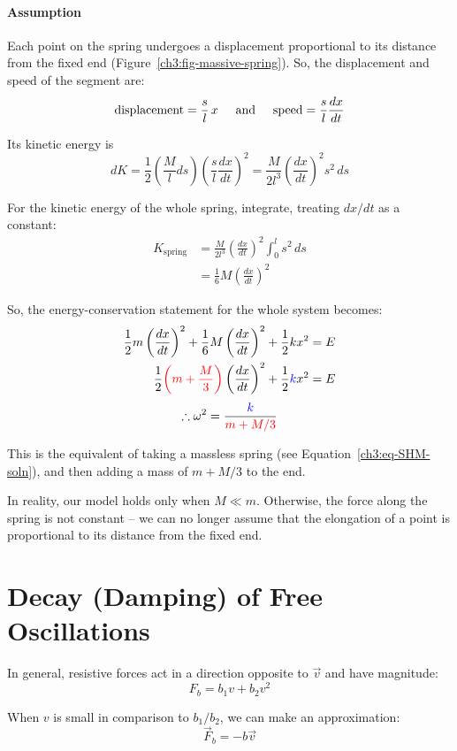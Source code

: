 \paragraph{Assumption} Each point on the spring undergoes a displacement proportional to its distance from the fixed end (Figure~\ref{ch3:fig-massive-spring}). So, the displacement and speed of the segment are:
\[ \text{displacement} = \frac{s}{l} \, x \hspace{0.5cm}\text{and}\hspace{0.5cm}
\text{speed} = \frac{s}{l} \frac{dx}{dt} 
\]

Its kinetic energy is \[ dK = \frac{1}{2}\left( \frac{M}{l} ds \right) \left( \frac{s}{l} \frac{dx}{dt} \right)^2 = \frac{M}{2l^3} \left( \frac{dx}{dt} \right)^2 s^2 \, ds \]

For the kinetic energy of the whole spring, integrate, treating $dx/dt$ as a constant:
\begin{align*}
K_\text{spring} &= \frac{M}{2l^3} \left( \frac{dx}{dt} \right)^2  \int_0^{l} s^2 \, ds \\
&= \frac{1}{6}M\left(\frac{dx}{dt}\right)^2
\end{align*}

So, the energy-conservation statement for the whole system becomes:
\begin{align*}
\frac{1}{2}m\left(\frac{dx}{dt}\right)^2 + \frac{1}{6}M\left( \frac{dx}{dt}\right)^2 + \frac{1}{2}kx^2 &= E  \\
\frac{1}{2} \textcolor{red}{\left( m + \frac{M}{3} \right)} \left(\frac{dx}{dt}\right)^2 + \frac{1}{2} \textcolor{blue}{k} x^2 &= E
\end{align*}
\[ \therefore \omega^2 = \frac{\textcolor{blue}{k}}{\textcolor{red}{m+M/3}} \]

This is the equivalent of taking a massless spring (see Equation~\ref{ch3:eq-SHM-soln}), and then adding a mass of $m + M/3$ to the end.

In reality, our model holds only when $M \ll m$. Otherwise, the force along the spring is not constant -- we can no longer assume that the elongation of a point is proportional to its distance from the fixed end.

\section{Decay (Damping) of Free Oscillations}

In general, resistive forces act in a direction opposite to $\vec{v}$ and have magnitude:
\[ F_b = b_1v + b_2v^2\]

When $v$ is small in comparison to $b_1/b_2$, we can make an approximation:
\begin{equation*}
	\boxed{\vec{F}_b = -b\vec{v}}
\end{equation*}

